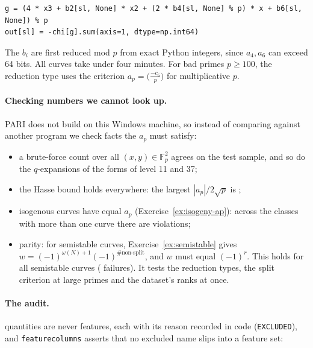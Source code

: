 \documentclass[11pt]{article}
\theoremstyle{definition}
\theoremstyle{plain}
\theoremstyle{remark}
\newcommand{\F}{\mathbb{F}}
\newcommand{\code}[1]{\texttt{#1}}
\renewcommand{\_}{\oldunderscore\allowbreak}
\newcommand{\file}[1]{\textcolor{blue!50!black}{\texttt{#1}}}
\newcommand{\codefrom}[1]{\par\smallskip\noindent{\footnotesize\textbf{From} \file{#1}}}
\begin{document}
\codefrom{src/eclab/features.py}
\begin{lstlisting}
g = (4 * x3 + b2[sl, None] * x2 + (2 * b4[sl, None] % p) * x + b6[sl, None]) % p
out[sl] = -chi[g].sum(axis=1, dtype=np.int64)
\end{lstlisting}

\noindent The $b_i$ are first reduced mod $p$ from exact Python integers, since $a_4,a_6$ can
exceed 64 bits. All \NCurves{} curves take under four minutes. For bad primes $p\ge100$, the
reduction type uses the criterion $a_p=\bigl(\tfrac{-c_6}{p}\bigr)$ for multiplicative $p$.

\paragraph{Checking numbers we cannot look up.}
PARI does not build on this Windows machine, so instead of comparing against another program
we check facts the $a_p$ must satisfy:
\begin{itemize}[nosep]
  \item a brute-force count over all $(x,y)\in\F_p^2$ agrees on the test sample, and so do the
        $q$-expansions of the forms of level 11 and 37;
  \item the Hasse bound holds everywhere: the largest $|a_p|/2\sqrt p$ is \HasseMax;
  \item isogenous curves have equal $a_p$ (Exercise~\ref{ex:isogeny-ap}): across the
        \NMultiCurveClasses{} classes with more than one curve there are \ApClassViolations{}
        violations;
  \item parity: for semistable curves, Exercise~\ref{ex:semistable} gives
        $w=(-1)^{\omega(N)+1}(-1)^{\#\text{non-split}}$, and $w$ must equal $(-1)^r$. This holds
        for all \ParityAgree{} semistable curves (\ParityDisagree{} failures). It tests the
        reduction types, the split criterion at large primes and the dataset's ranks at once.
\end{itemize}

\paragraph{The audit.}
\NExcluded{} quantities are never features, each with its reason recorded in code
(\code{EXCLUDED}), and \code{feature\_columns} asserts that no excluded name slips into a feature
set:
\end{document}
